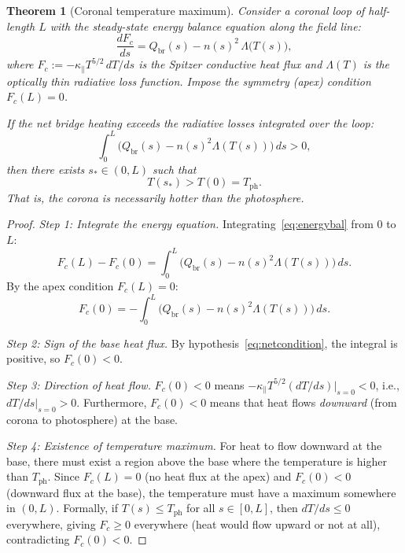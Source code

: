 \documentclass[12pt]{article}
\theoremstyle{plain}
\newtheorem{theorem}{Theorem}[section]
\theoremstyle{definition}
\numberwithin{equation}{section}
\newcommand{\br}{\mathrm{br}}
\newcommand{\ph}{\mathrm{ph}}
\begin{document}
\begin{theorem}[Coronal temperature maximum]\label{thm:tempmax}
Consider a coronal loop of half-length $L$ with the steady-state
energy balance equation along the field line:
\begin{equation}\label{eq:energybal}
\frac{dF_c}{ds} = Q_{\br}(s) - n(s)^2\,\Lambda\!\bigl(T(s)\bigr),
\end{equation}
where $F_c:=-\kappa_\parallel T^{5/2}\,dT/ds$ is the Spitzer
conductive heat flux and $\Lambda(T)$ is the optically thin
radiative loss function.  Impose the symmetry (apex) condition
$F_c(L)=0$.

If the net bridge heating exceeds the radiative losses integrated
over the loop:
\begin{equation}\label{eq:netcondition}
\int_0^L \bigl(Q_{\br}(s)-n(s)^2\Lambda(T(s))\bigr)\,ds > 0,
\end{equation}
then there exists $s_*\in(0,L)$ such that
\begin{equation}\label{eq:Tmax}
\boxed{T(s_*) > T(0) = T_{\ph}.}
\end{equation}
That is, the corona is necessarily hotter than the photosphere.
\end{theorem}

\begin{proof}
\emph{Step 1: Integrate the energy equation.}
Integrating~\eqref{eq:energybal} from $0$ to $L$:
\begin{equation}
F_c(L) - F_c(0)
= \int_0^L\bigl(Q_{\br}(s)-n(s)^2\Lambda(T(s))\bigr)\,ds.
\end{equation}
By the apex condition $F_c(L)=0$:
\begin{equation}
F_c(0) = -\int_0^L\bigl(Q_{\br}(s)-n(s)^2\Lambda(T(s))\bigr)\,ds.
\end{equation}

\emph{Step 2: Sign of the base heat flux.}
By hypothesis~\eqref{eq:netcondition}, the integral is positive,
so $F_c(0)<0$.

\emph{Step 3: Direction of heat flow.}
$F_c(0)<0$ means
$-\kappa_\parallel T^{5/2}(dT/ds)|_{s=0}<0$, i.e.,
$dT/ds|_{s=0}>0$.  Furthermore, $F_c(0)<0$ means that heat flows
\emph{downward} (from corona to photosphere) at the base.

\emph{Step 4: Existence of temperature maximum.}
For heat to flow downward at the base, there must exist a region
above the base where the temperature is higher than $T_{\ph}$.
Since $F_c(L)=0$ (no heat flux at the apex) and $F_c(0)<0$
(downward flux at the base), the temperature must have a maximum
somewhere in $(0,L)$.  Formally, if $T(s)\leq T_{\ph}$ for all
$s\in[0,L]$, then $dT/ds\leq 0$ everywhere, giving $F_c\geq 0$
everywhere (heat would flow upward or not at all), contradicting
$F_c(0)<0$.
\end{proof}
\end{document}
